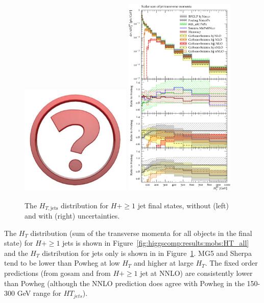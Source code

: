 \begin{figure}[t!]
  \centering
  \includegraphics[width=0.47\textwidth]{Micon.pdf}
  \hfill
  \includegraphics[width=0.47\textwidth]{figures/hjetscomp_HT_jets.pdf}
  \caption{
    The $H_{T,\mathrm{jets}}$ distribution for $H+\ge1$ jet final
    states, without (left) and with (right) uncertainties.
    \label{fig:higgscomp:results:mobs:HT_jets}
  }
\end{figure}

The $H_T$ distribution (sum of the transverse momenta for all objects
in the final state) for $H+\ge1$ jets is shown in
Figure~\ref{fig:higgscomp:results:mobs:HT_all} and the $H_T$
distribution for jets only is shown in in
Figure~\ref{fig:higgscomp:results:mobs:HT_jets}. 
MG5 and Sherpa tend to be lower than Powheg at low $H_T$ and higher at
large $H_T$. The fixed order predictions (from gosam and from $H+\ge1$
jet at NNLO) are consistently lower than Powheg (although the NNLO
prediction does agree with Powheg in the 150-300 GeV range for
$HT_{jets}$).




